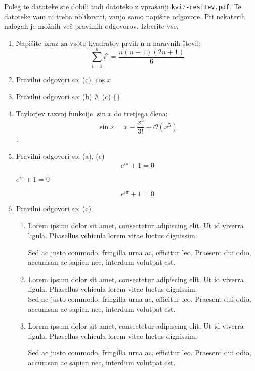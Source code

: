 \documentclass[11pt]{article}
\begin{document}
Poleg te datoteke ste dobili tudi datoteko z vprašanji \texttt{kviz-resitev.pdf}.
Te datoteke vam ni treba oblikovati, vanjo samo napišite odgovore.
Pri nekaterih nalogah je možnih več pravilnih odgovorov. Izberite vse.

\begin{enumerate}
    \item Napišite izraz za vsoto kvadratov prvih n n naravnih števil: $$\sum_{i=1}^{n}i^2=\frac{n(n+1)(2n+1)}{6}$$

    \item Pravilni odgovori so: (c) $\cos x$
    
    \item Pravilni odgovori so: (b) $\emptyset$, (c) $\{\}$
    
    \item Taylorjev razvoj funkcije $\sin x$ do tretjega člena:
    $$\sin x =x-\frac{x^3}{3!}+\mathcal{O}(x^5)$$.

    \item Pravilni odgovori so:  (a), (c)%
      \[ e^{i \pi} + 1 = 0 \]
      \begin{center}
          \( e^{i \pi} + 1 = 0 \)
      \end{center}
      \begin{equation*}
          e^{i \pi} + 1 = 0
      \end{equation*}

    \item Pravilni odgovori so: (c) %
        \begin{enumerate}
            \item {
                Lorem ipsum dolor sit amet, consectetur adipiscing elit. Ut id viverra ligula. Phasellus vehicula lorem vitae luctus dignissim. 
                
                Sed ac justo commodo, fringilla urna ac, efficitur leo. Praesent dui odio, accumsan ac sapien nec, interdum volutpat est. 
            }
            \item {
                Lorem ipsum dolor sit amet, consectetur adipiscing elit. Ut id viverra ligula. Phasellus vehicula lorem vitae luctus dignissim. \\
                Sed ac justo commodo, fringilla urna ac, efficitur leo. Praesent dui odio, accumsan ac sapien nec, interdum volutpat est. 
            }
            \item {
                Lorem ipsum dolor sit amet, consectetur adipiscing elit. Ut id viverra ligula. Phasellus vehicula lorem vitae luctus dignissim. \par
                Sed ac justo commodo, fringilla urna ac, efficitur leo. Praesent dui odio, accumsan ac sapien nec, interdum volutpat est. 
            }
        \end{enumerate}
    

\end{enumerate}
\end{document}
